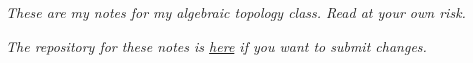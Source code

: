 \textit{These are my notes for my algebraic topology class. Read at your own risk.} 

\textit{The repository for these notes is \href{https://github.com/silky/alg-top-notes}{here} if you want to submit changes.}